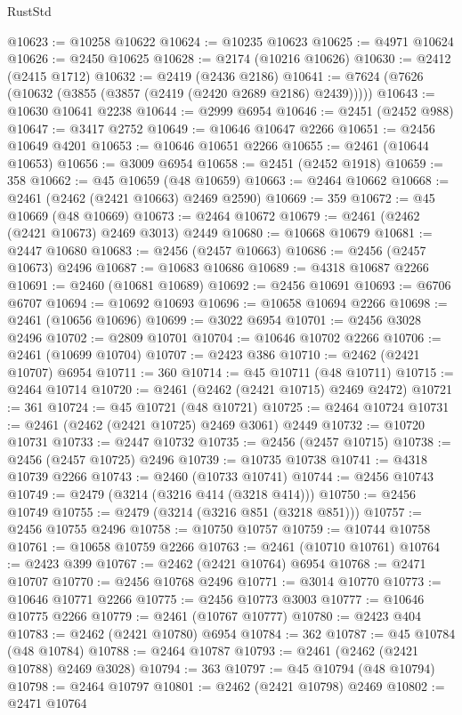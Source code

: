 \begin{lexlean}{RustStd}
\begin{coremodule}
@10623 := @10258 @10622
@10624 := @10235 @10623
@10625 := @4971 @10624
@10626 := @2450 @10625
@10628 := @2174 (@10216 @10626)
@10630 := @2412 (@2415 @1712)
@10632 := @2419 (@2436 @2186)
@10641 := @7624 (@7626 (@10632 (@3855 (@3857 (@2419 (@2420 @2689 @2186) @2439)))))
@10643 := @10630 @10641 @2238
@10644 := @2999 @6954
@10646 := @2451 (@2452 @988)
@10647 := @3417 @2752
@10649 := @10646 @10647 @2266
@10651 := @2456 @10649 @4201
@10653 := @10646 @10651 @2266
@10655 := @2461 (@10644 @10653)
@10656 := @3009 @6954
@10658 := @2451 (@2452 @1918)
@10659 := 358
@10662 := @45 @10659 (@48 @10659)
@10663 := @2464 @10662
@10668 := @2461 (@2462 (@2421 @10663) @2469 @2590)
@10669 := 359
@10672 := @45 @10669 (@48 @10669)
@10673 := @2464 @10672
@10679 := @2461 (@2462 (@2421 @10673) @2469 @3013) @2449
@10680 := @10668 @10679
@10681 := @2447 @10680
@10683 := @2456 (@2457 @10663)
@10686 := @2456 (@2457 @10673) @2496
@10687 := @10683 @10686
@10689 := @4318 @10687 @2266
@10691 := @2460 (@10681 @10689)
@10692 := @2456 @10691
@10693 := @6706 @6707
@10694 := @10692 @10693
@10696 := @10658 @10694 @2266
@10698 := @2461 (@10656 @10696)
@10699 := @3022 @6954
@10701 := @2456 @3028 @2496
@10702 := @2809 @10701
@10704 := @10646 @10702 @2266
@10706 := @2461 (@10699 @10704)
@10707 := @2423 @386
@10710 := @2462 (@2421 @10707) @6954
@10711 := 360
@10714 := @45 @10711 (@48 @10711)
@10715 := @2464 @10714
@10720 := @2461 (@2462 (@2421 @10715) @2469 @2472)
@10721 := 361
@10724 := @45 @10721 (@48 @10721)
@10725 := @2464 @10724
@10731 := @2461 (@2462 (@2421 @10725) @2469 @3061) @2449
@10732 := @10720 @10731
@10733 := @2447 @10732
@10735 := @2456 (@2457 @10715)
@10738 := @2456 (@2457 @10725) @2496
@10739 := @10735 @10738
@10741 := @4318 @10739 @2266
@10743 := @2460 (@10733 @10741)
@10744 := @2456 @10743
@10749 := @2479 (@3214 (@3216 @414 (@3218 @414)))
@10750 := @2456 @10749
@10755 := @2479 (@3214 (@3216 @851 (@3218 @851)))
@10757 := @2456 @10755 @2496
@10758 := @10750 @10757
@10759 := @10744 @10758
@10761 := @10658 @10759 @2266
@10763 := @2461 (@10710 @10761)
@10764 := @2423 @399
@10767 := @2462 (@2421 @10764) @6954
@10768 := @2471 @10707
@10770 := @2456 @10768 @2496
@10771 := @3014 @10770
@10773 := @10646 @10771 @2266
@10775 := @2456 @10773 @3003
@10777 := @10646 @10775 @2266
@10779 := @2461 (@10767 @10777)
@10780 := @2423 @404
@10783 := @2462 (@2421 @10780) @6954
@10784 := 362
@10787 := @45 @10784 (@48 @10784)
@10788 := @2464 @10787
@10793 := @2461 (@2462 (@2421 @10788) @2469 @3028)
@10794 := 363
@10797 := @45 @10794 (@48 @10794)
@10798 := @2464 @10797
@10801 := @2462 (@2421 @10798) @2469
@10802 := @2471 @10764

\end{coremodule}
\end{lexlean}
